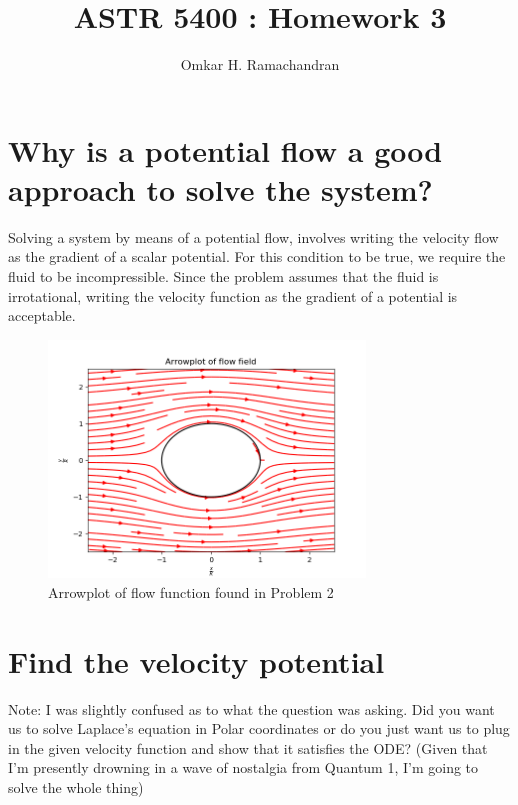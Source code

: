 \documentclass[english]{article}
\begin{document}
\title{ASTR 5400 : Homework 3}
\author{Omkar H. Ramachandran}

\maketitle

\section{Why is a potential flow a good approach to solve the system?}
Solving a system by means of a potential flow, involves writing the velocity
flow as the gradient of a scalar potential. 
For this condition to be true, we require the fluid to be incompressible.
Since the problem assumes that the fluid is irrotational, writing the velocity
function as the gradient of a potential is acceptable.
\begin{figure}
	\centering
	\includegraphics[width=0.75\textwidth]{arrowplotp2.png}
	\caption{Arrowplot of flow function found in Problem 2}
	\label{fig:streamplot1}
\end{figure}

\section{Find the velocity potential}
Note: I was slightly confused as to what the question was asking. Did you
want us to solve Laplace's equation in Polar coordinates or do you just want
us to plug in the given velocity function and show that it satisfies the ODE? 
(Given that I'm presently drowning in a wave of nostalgia from Quantum 1,
I'm going to solve the whole thing)
\end{document}
